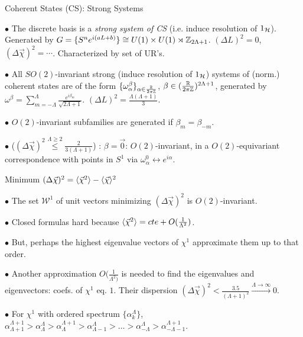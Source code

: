 \begin{frame}{Coherent States (CS): Strong Systems} %

    $\bullet$ The discrete basis is a \textit{strong system of CS} (i.e. induce resolution of $1_{\mathcal H}$). Generated by $G = \{S^n e^{i(aL + b)}\}\cong U(1)\times U(1) \rtimes \mathbb Z_{2\Lambda + 1}$. $(\Delta L)^2 = 0$, $(\Delta \vec \chi)^2 = \cdots$. Characterized by set of UR's.
    
    $\bullet$ All $SO(2)$-invariant strong (induce resolution of $1_\mathcal H$) systems of (norm.) coherent states are of the form $\{\omega^\beta_\alpha\}_{\alpha \in \frac{\mathbb R}{2\pi\mathbb Z}}$, $\beta \in (\frac{\mathbb R}{2\pi\mathbb Z})^{2\Lambda+1}$, generated by $\omega^\beta = \sum_{m = -\Lambda}^\Lambda \frac{e^{i\beta_m}}{\sqrt{2\Lambda+1}}$. $(\Delta L)^2 = \frac{\Lambda(\Lambda + 1)}{3}$.
    
    $\bullet$ $O(2)$-invariant subfamilies are generated if $\beta_m = \beta_{-m}$. 
    
    $\bullet$  ($(\Delta \vec \chi)^2 \overset{\Lambda \geq 2}{\leq } \frac{2}{3(\Lambda + 1)}$) :  $\beta = \vec 0$: $O(2)$-invariant, in a $O(2)$-equivariant correspondence with points in $S^1$ via $\omega^0_\alpha \leftrightarrow e^{i \alpha}$.
\end{frame}

\begin{frame}{Minimum $(\Delta \vec \chi)^2 = \langle \vec \chi^2 \rangle - \langle \vec \chi \rangle ^2$} %

    $\bullet$ The set $\mathcal W^1$ of unit vectors minimizing $(\Delta \vec \chi)^2$ is $O(2)$-invariant.
    
    $\bullet$ Closed formulas hard because $\langle \vec \chi ^2 \rangle = cte + O(\frac{1}{\Lambda^2})$.
    
    $\bullet$ But, perhaps the highest eigenvalue vectors of $\chi^1$ approximate them up to that order.
    
    $\bullet$ Another approximation $O(\frac{1}{\Lambda^2)}$ is needed to find the eigenvalues and eigenvectors: coefs. of $\chi^1$ eq. $1$. Their dispersion $(\Delta \vec \chi)^2 < \frac{3.5}{(\Lambda+1)^2} \overset{\Lambda \to \infty}{\longrightarrow} 0$.
    
    $\bullet$ For $\chi^1$ with ordered spectrum $\{\alpha^\Lambda_k\}$, 
    $\alpha_{\Lambda+1}^{\Lambda+1} > \alpha_{\Lambda}^{\Lambda} > \alpha_\Lambda^{\Lambda+1} > \alpha_{\Lambda-1}^{\Lambda} > \dots > \alpha_{-\Lambda}^{\Lambda} > \alpha_{-\Lambda-1}^{\Lambda+1}$.
    
\end{frame}